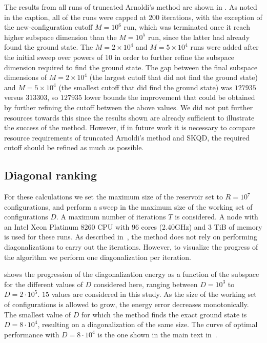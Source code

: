 \documentclass[
  reprint,            %
  amsmath,amssymb,
  aps,
  superscriptaddress, %
  longbibliography
]{revtex4-2}
\theoremstyle{definition}
\begin{document}
The results from all runs of truncated Arnoldi's method are shown in .
As noted in the caption, all of the runs were capped at $200$ iterations, with the exception of the new-configuration cutoff $M=10^6$ run, which was terminated once it reach higher subspace dimension than the $M=10^5$ run, since the latter had already found the ground state.
The $M=2\times10^4$ and $M=5\times10^4$ runs were added after the initial sweep over powers of $10$ in order to further refine the subspace dimension required to find the ground state.
The gap between the final subspace dimensions of $M=2\times10^4$ (the largest cutoff that did not find the ground state) and $M=5\times10^4$ (the smallest cutoff that did find the ground state) was $127935$ versus $313303$, so $127935$ lower bounds the improvement that could be obtained by further refining the cutoff between the above values.
We did not put further resources towards this since the results shown are already sufficient to illustrate the success of the method.
However, if in future work it is necessary to compare resource requirements of truncated Arnoldi's method and SKQD, the required cutoff should be refined as much as possible.

\subsection{Diagonal ranking}\label{sec:diag ranking num}
For these calculations we set the maximum size of the reservoir set to $R = 10^7$ configurations, and perform a sweep in the maximum size of the working set of configurations $D$. A maximum number of iterations $T$ is considered. A node with an Intel Xeon Platinum 8260 CPU with 96 cores (2.40GHz) and 3 TiB of memory is used for these runs. As described in~, the method does not rely on performing diagonalizations to carry out the iterations. However, to visualize the progress of the algorithm we perform one diagonalization per iteration.

 shows the progression of the diagonalization energy as a function of the subspace for the different values of $D$ considered here, ranging between $D = 10^3$ to $D = 2\cdot 10^5$. $15$ values are considered in this study. As the size of the working set of configurations is allowed to grow, the energy error decreases monotonically. The smallest value of $D$ for which the method finds the exact ground state is $D = 8\cdot 10^4$, resulting on a diagonalization of the same size. The curve of optimal performance with $D =8\cdot 10^4 $ is the one shown in the main text in~.
\end{document}
